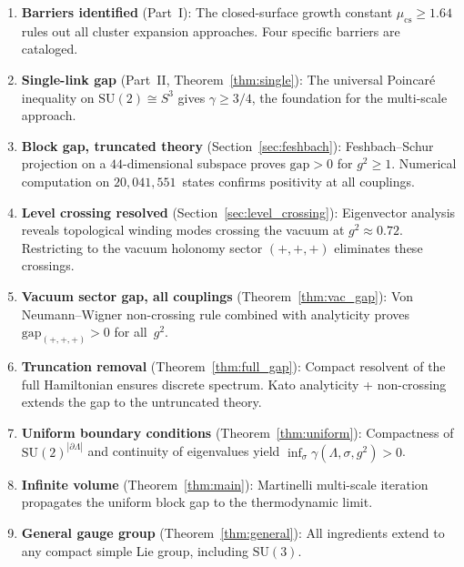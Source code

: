 \documentclass[12pt,a4paper]{article}
\begin{document}
\begin{enumerate}
\item \textbf{Barriers identified} (Part~I): The closed-surface growth constant $\mu_{\mathrm{cs}}\ge 1.64$ rules out all cluster expansion approaches. Four specific barriers are cataloged.

\item \textbf{Single-link gap} (Part~II, Theorem~\ref{thm:single}): The universal Poincar\'e inequality on $\mathrm{SU}(2)\cong S^3$ gives $\gamma\ge 3/4$, the foundation for the multi-scale approach.

\item \textbf{Block gap, truncated theory} (Section~\ref{sec:feshbach}): Feshbach--Schur projection on a $44$-dimensional subspace proves $\mathrm{gap}>0$ for $g^2\ge 1$. Numerical computation on $20{,}041{,}551$~states confirms positivity at all couplings.

\item \textbf{Level crossing resolved} (Section~\ref{sec:level_crossing}): Eigenvector analysis reveals topological winding modes crossing the vacuum at $g^2\approx 0.72$. Restricting to the vacuum holonomy sector $(+,+,+)$ eliminates these crossings.

\item \textbf{Vacuum sector gap, all couplings} (Theorem~\ref{thm:vac_gap}): Von Neumann--Wigner non-crossing rule combined with analyticity proves $\mathrm{gap}_{(+,+,+)}>0$ for all~$g^2$.

\item \textbf{Truncation removal} (Theorem~\ref{thm:full_gap}): Compact resolvent of the full Hamiltonian ensures discrete spectrum. Kato analyticity + non-crossing extends the gap to the untruncated theory.

\item \textbf{Uniform boundary conditions} (Theorem~\ref{thm:uniform}): Compactness of $\mathrm{SU}(2)^{|\partial\Lambda|}$ and continuity of eigenvalues yield $\inf_\sigma\gamma(\Lambda,\sigma,g^2)>0$.

\item \textbf{Infinite volume} (Theorem~\ref{thm:main}): Martinelli multi-scale iteration propagates the uniform block gap to the thermodynamic limit.

\item \textbf{General gauge group} (Theorem~\ref{thm:general}): All ingredients extend to any compact simple Lie group, including $\mathrm{SU}(3)$.
\end{enumerate}
\end{document}
